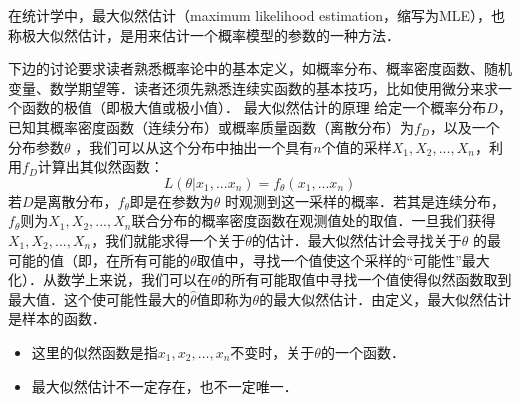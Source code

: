 \begin{issues}
\issueTODO
\end{issues}
在统计学中，最大似然估计（maximum likelihood estimation，缩写为MLE），也称极大似然估计，是用来估计一个概率模型的参数的一种方法．

下边的讨论要求读者熟悉概率论中的基本定义，如概率分布、概率密度函数、随机变量、数学期望等．读者还须先熟悉连续实函数的基本技巧，比如使用微分来求一个函数的极值（即极大值或极小值）．
最大似然估计的原理
给定一个概率分布$D $，已知其概率密度函数（连续分布）或概率质量函数（离散分布）为$f_D $，以及一个分布参数$\theta $ ，我们可以从这个分布中抽出一个具有$n$个值的采样$X_{1},X_{2},... ,X_{n} $，利用$f_D$计算出其似然函数：
$$
L(\theta|x_1,...x_n ) = f_{\theta }(x_1,...x_n )
$$
若$D$是离散分布，$f_{\theta }$即是在参数为$\theta$ 时观测到这一采样的概率．若其是连续分布，$f_{\theta }$则为$X_{1},X_{2},... ,X_{n} $联合分布的概率密度函数在观测值处的取值．一旦我们获得$X_{1},X_{2},... ,X_{n} $，我们就能求得一个关于$\theta $的估计．最大似然估计会寻找关于$\theta$ 的最可能的值（即，在所有可能的$\theta $取值中，寻找一个值使这个采样的“可能性”最大化）．从数学上来说，我们可以在$\theta $的所有可能取值中寻找一个值使得似然函数取到最大值．这个使可能性最大的$\widehat{\theta}$值即称为$\theta $的最大似然估计．由定义，最大似然估计是样本的函数．
\begin{itemize}
\item 这里的似然函数是指$x_1,x_2,\ldots,x_n$不变时，关于$\theta $的一个函数．
\item 最大似然估计不一定存在，也不一定唯一．
\end{itemize}


